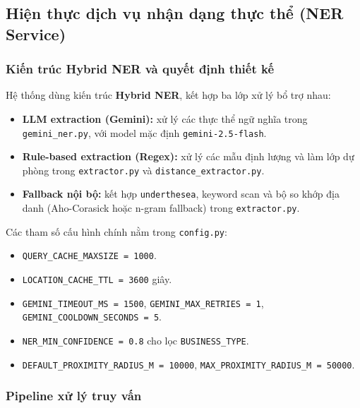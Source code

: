 \subsection{Hiện thực dịch vụ nhận dạng thực thể (NER Service)}


\subsubsection{Kiến trúc Hybrid NER và quyết định thiết kế}

Hệ thống dùng kiến trúc \textbf{Hybrid NER}, kết hợp ba lớp xử lý bổ trợ nhau:
\begin{itemize}
    \item \textbf{LLM extraction (Gemini):} xử lý các thực thể ngữ nghĩa trong \texttt{gemini\_ner.py}, với model mặc định \texttt{gemini-2.5-flash}.
    \item \textbf{Rule-based extraction (Regex):} xử lý các mẫu định lượng và làm lớp dự phòng trong \texttt{extractor.py} và \texttt{distance\_extractor.py}.
    \item \textbf{Fallback nội bộ:} kết hợp \texttt{underthesea}, keyword scan và bộ so khớp địa danh (Aho-Corasick hoặc n-gram fallback) trong \texttt{extractor.py}.
\end{itemize}

Các tham số cấu hình chính nằm trong \texttt{config.py}:
\begin{itemize}
    \item \texttt{QUERY\_CACHE\_MAXSIZE = 1000}.
    \item \texttt{LOCATION\_CACHE\_TTL = 3600} giây.
    \item \texttt{GEMINI\_TIMEOUT\_MS = 1500}, \texttt{GEMINI\_MAX\_RETRIES = 1}, \texttt{GEMINI\_COOLDOWN\_SECONDS = 5}.
    \item \texttt{NER\_MIN\_CONFIDENCE = 0.8} cho lọc \texttt{BUSINESS\_TYPE}.
    \item \texttt{DEFAULT\_PROXIMITY\_RADIUS\_M = 10000}, \texttt{MAX\_PROXIMITY\_RADIUS\_M = 50000}.
\end{itemize}


\subsubsection{Pipeline xử lý truy vấn}

